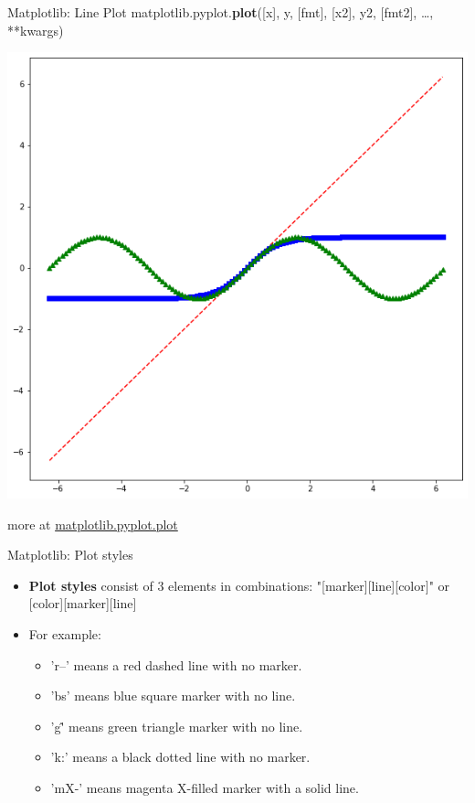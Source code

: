 \documentclass{beamer}
\begin{document}
    \begin{frame}[fragile]{Matplotlib: Line Plot}
        matplotlib.pyplot.\textbf{plot}([x], y, [fmt], [x2], y2, [fmt2], \dots, **kwargs)\\
        \begin{center}
            \includegraphics[width=\textwidth,height=0.6\textheight,keepaspectratio]{figures/Plot.png}\\
        \end{center}
        more at \href{https://matplotlib.org/stable/api/_as_gen/matplotlib.pyplot.plot.html}{matplotlib.pyplot.plot}
    \end{frame}
    \begin{frame}[fragile]{Matplotlib: Plot styles}
        \begin{itemize}
            \item \textbf{Plot styles} consist of 3 elements in combinations: "[marker][line][color]" or [color][marker][line]
            \item For example:
            \begin{itemize}
                \item 'r--' means a red dashed line with no marker.
                \item 'bs' means blue square marker with no line.
                \item 'g\^' means green triangle marker with no line.
                \item 'k:' means a black dotted line with no marker.
                \item 'mX-' means magenta X-filled marker with a solid line.
            \end{itemize}
        \end{itemize}
    \end{frame}
\end{document}

